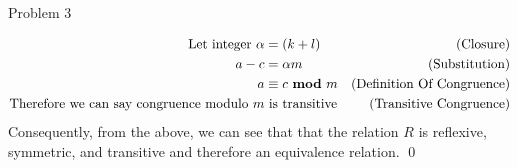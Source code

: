 \begin{problem}{Problem 3}
\begin{Highlight}[Solution]
\begin{align*}
            \text{Let integer } \alpha & = (k + l) & \text{(Closure)} \\
            a - c & = \alpha m & \text{(Substitution)} \\
            a & \equiv c \text{ \textbf{mod} } m & \text{(Definition Of Congruence)} \\
            \text{Therefore we can say congruence modulo } m & \text{ is transitive} & \text{(Transitive Congruence)}
        \end{align*}
        Consequently, from the above, we can see that that the relation $R$ is reflexive, symmetric, and transitive and therefore an equivalence relation. \qed
    \end{Highlight}
\end{problem}